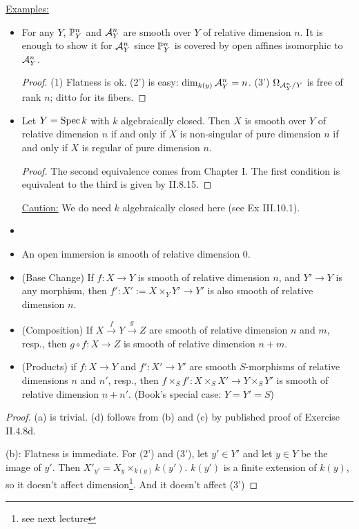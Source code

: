  \underline{Examples:}
 \begin{itemize}
 \item[(i)] For any $Y$, $\P^n_Y$ and $\A^n_Y$ are smooth over
 $Y$ of relative dimension $n$.  It is enough to show it for $\A^n_Y$ since $\P^n_Y$ is
 covered by open affines isomorphic to $\A^n_Y$.
 \begin{proof}
 (1) Flatness is ok. (2') is easy: $\dim_{k(y)} \A^n_Y = n$.  (3')
 $\Omega_{\A^n_Y/Y}$ is free of rank $n$; ditto for its fibers.
 \end{proof}

 \item[(ii)] Let $Y=\spec k$ with $k$ algebraically closed.  Then
 $X$ is smooth over $Y$ of relative dimension $n$ if and only if
 $X$ is non-singular of pure dimension $n$ if and only if $X$ is
 regular of pure dimension $n$.
 \begin{proof}
 The second equivalence comes from Chapter I.  The first condition
 is equivalent to the third is given by II.8.15.
 \end{proof}
 \underline{Caution:} We do need $k$ algebraically closed here
  (see Ex III.10.1).
 \end{itemize}

 \begin{proposition}
 \begin{itemize}
 \item[]
 \item[(a)] An open immersion is smooth of relative dimension 0.
 \item[(b)] (Base Change) If $f:X\to Y$ is smooth of relative
 dimension $n$, and $Y'\to Y$ is any morphism, then $f':X':=
 X\times_Y Y'\to Y'$ is also smooth of relative dimension $n$.
 \item[(c)] (Composition) If $X\xrightarrow{f} Y\xrightarrow{g} Z$
 are smooth of relative dimension $n$ and $m$, resp., then $g\circ
 f:X\to Z$ is smooth of relative dimension $n+m$.
 \item[(d)] (Products) if $f:X\to Y$ and $f':X'\to Y'$ are smooth
 $S$-morphisms of relative dimensions $n$ and $n'$, resp., then
 $f\times_S f':X\times_S X' \to Y\times_S Y'$ is smooth of
 relative dimension $n+n'$. (Book's special case: $Y=Y'=S$)
 \end{itemize}
 \end{proposition}
 \begin{proof}
 (a) is trivial. (d) follows from (b) and (c) by published proof of Exercise
 II.4.8d.

 (b): Flatness is immediate.  For (2') and (3'), let $y'\in Y'$ and
 let $y\in Y$ be the image of $y'$.  Then $X'_{y'} = X_y
 \times_{k(y)} k(y')$.  $k(y')$ is a finite extension of $k(y)$,
 so it doesn't affect dimension\footnote{see next lecture}.  And it doesn't affect (3')
 \end{proof}
